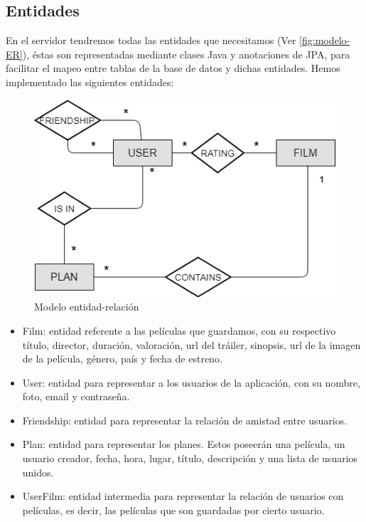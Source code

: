 \subsection{Entidades}
\label{makereference4.3.1}
En el servidor tendremos todas las entidades que necesitamos
 (Ver \autoref{fig:modelo-ER}), éstas son representadas
 mediante clases Java y anotaciones de JPA, para facilitar el mapeo entre
 tablas de la base de datos y dichas entidades.
Hemos implementado las siguientes entidades:
\begin{figure}[H]
    \centering
    \includegraphics[width=6in]{figures/chapter-4/Entidades-ER.png}
    \caption{Modelo entidad-relación}
    \label{fig:modelo-ER}
\end{figure}
\begin{itemize}
    \item Film: entidad referente a las películas que guardamos, con su respectivo título, director, duración, valoración, url del tráiler, sinopsis, url de la imagen de la película, género, país y fecha de estreno.
    \item User: entidad para representar a los usuarios de la aplicación, con su nombre, foto, email y contraseña.
    \item Friendship: entidad para representar la relación de amistad entre usuarios.
    \item Plan: entidad para representar los planes. Estos poseerán una película, un usuario creador, fecha, hora, lugar, título, descripción y una lista de usuarios unidos.
    \item UserFilm: entidad intermedia para representar la relación de usuarios con películas, es decir, las películas que son guardadas por cierto usuario.
\end{itemize}

